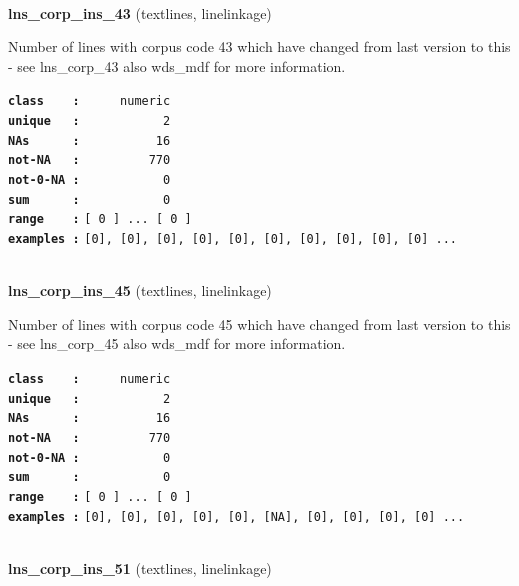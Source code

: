 \documentclass[]{article}
\begin{document}
~

\textbf{lns\_corp\_ins\_43} (textlines, linelinkage)

Number of lines with corpus code 43 which have changed from last version
to this - see lns\_corp\_43 also wds\_mdf for more information.

\textbf{\texttt{class\ \ \ \ :}} \texttt{~~~~~numeric}\\
\textbf{\texttt{unique\ \ \ :}} \texttt{~~~~~~~~~~~2}\\
\textbf{\texttt{NAs\ \ \ \ \ \ :}} \texttt{~~~~~~~~~~16}\\
\textbf{\texttt{not-NA\ \ \ :}} \texttt{~~~~~~~~~770}\\
\textbf{\texttt{not-0-NA\ :}} \texttt{~~~~~~~~~~~0}\\
\textbf{\texttt{sum\ \ \ \ \ \ :}} \texttt{~~~~~~~~~~~0}\\
\textbf{\texttt{range\ \ \ \ :}}
\texttt{{[}\ 0\ {]}\ ...\ {[}\ 0\ {]}}\\
\textbf{\texttt{examples\ :}}
\texttt{{[}0{]},\ {[}0{]},\ {[}0{]},\ {[}0{]},\ {[}0{]},\ {[}0{]},\ {[}0{]},\ {[}0{]},\ {[}0{]},\ {[}0{]}\ ...}\\

~

\textbf{lns\_corp\_ins\_45} (textlines, linelinkage)

Number of lines with corpus code 45 which have changed from last version
to this - see lns\_corp\_45 also wds\_mdf for more information.

\textbf{\texttt{class\ \ \ \ :}} \texttt{~~~~~numeric}\\
\textbf{\texttt{unique\ \ \ :}} \texttt{~~~~~~~~~~~2}\\
\textbf{\texttt{NAs\ \ \ \ \ \ :}} \texttt{~~~~~~~~~~16}\\
\textbf{\texttt{not-NA\ \ \ :}} \texttt{~~~~~~~~~770}\\
\textbf{\texttt{not-0-NA\ :}} \texttt{~~~~~~~~~~~0}\\
\textbf{\texttt{sum\ \ \ \ \ \ :}} \texttt{~~~~~~~~~~~0}\\
\textbf{\texttt{range\ \ \ \ :}}
\texttt{{[}\ 0\ {]}\ ...\ {[}\ 0\ {]}}\\
\textbf{\texttt{examples\ :}}
\texttt{{[}0{]},\ {[}0{]},\ {[}0{]},\ {[}0{]},\ {[}0{]},\ {[}NA{]},\ {[}0{]},\ {[}0{]},\ {[}0{]},\ {[}0{]}\ ...}\\

~

\textbf{lns\_corp\_ins\_51} (textlines, linelinkage)
\end{document}
